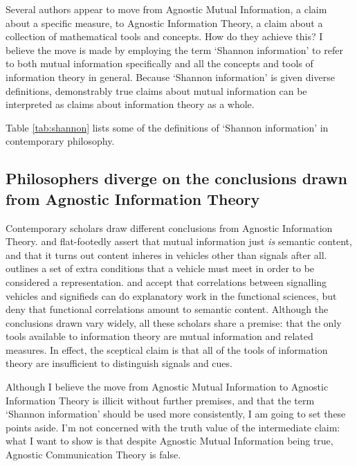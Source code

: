 Several authors appear to move from {\sc Agnostic Mutual Information}, a claim about a specific measure, to {\sc Agnostic Information Theory}, a claim about a collection of mathematical tools and concepts.
How do they achieve this?
I believe the move is made by employing the term `Shannon information' to refer to both mutual information specifically and all the concepts and tools of information theory in general.
Because `Shannon information' is given diverse definitions, demonstrably true claims about mutual information can be interpreted as claims about information theory as a whole.

Table \ref{tab:shannon} lists some of the definitions of `Shannon information' in contemporary philosophy.



\subsection{\sloppy Philosophers diverge on the conclusions drawn from {\sc Agnostic Information Theory}}

Contemporary scholars draw different conclusions from {\sc Agnostic Information Theory}.
\citet{skyrms2010signals} and \citet{isaac2018semantics} flat-footedly assert that mutual information just \textit{is} semantic content, and that it turns out content inheres in vehicles other than signals after all.
\citet[SECTION]{shea2018representation} outlines a set of extra conditions that a vehicle must meet in order to be considered a representation. 
\citet{lean2014shannon} and \citet[CHAPTER]{hutto2017evolving} accept that correlations between signalling vehicles and signifieds can do explanatory work in the functional sciences, but deny that functional correlations amount to semantic content.
Although the conclusions drawn vary widely, all these scholars share a premise: that the only tools available to information theory are mutual information and related measures.
In effect, the sceptical claim is that all of the tools of information theory are insufficient to distinguish signals and cues.

Although I believe the move from {\sc Agnostic Mutual Information} to {\sc Agnostic Information Theory} is illicit without further premises, and that the term `Shannon information' should be used more consistently, I am going to set these points aside.
I'm not concerned with the truth value of the intermediate claim: what I want to show is that despite {\sc Agnostic Mutual Information} being true, {\sc Agnostic Communication Theory} is false.

